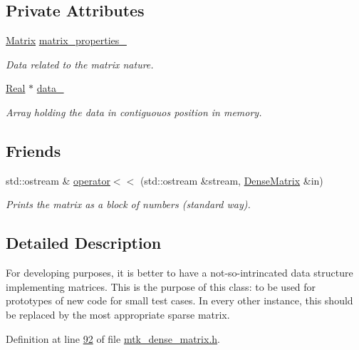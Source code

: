 \subsection*{Private Attributes}
\begin{DoxyCompactItemize}
\item 
\hyperlink{classmtk_1_1Matrix}{Matrix} \hyperlink{classmtk_1_1DenseMatrix_a481c8d09af685a5ba67acefdcaa810cc}{matrix\-\_\-properties\-\_\-}
\begin{DoxyCompactList}\small\item\em Data related to the matrix nature. \end{DoxyCompactList}\item 
\hyperlink{group__c01-roots_gac080bbbf5cbb5502c9f00405f894857d}{Real} $\ast$ \hyperlink{classmtk_1_1DenseMatrix_a7893e4e5c8d2e2de32b156177e78cb6f}{data\-\_\-}
\begin{DoxyCompactList}\small\item\em Array holding the data in contiguouos position in memory. \end{DoxyCompactList}\end{DoxyCompactItemize}
\subsection*{Friends}
\begin{DoxyCompactItemize}
\item 
std\-::ostream \& \hyperlink{classmtk_1_1DenseMatrix_adbcc850ef373550f634f563573a31d28}{operator$<$$<$} (std\-::ostream \&stream, \hyperlink{classmtk_1_1DenseMatrix}{Dense\-Matrix} \&in)
\begin{DoxyCompactList}\small\item\em Prints the matrix as a block of numbers (standard way). \end{DoxyCompactList}\end{DoxyCompactItemize}


\subsection{Detailed Description}
For developing purposes, it is better to have a not-\/so-\/intrincated data structure implementing matrices. This is the purpose of this class\-: to be used for prototypes of new code for small test cases. In every other instance, this should be replaced by the most appropriate sparse matrix. 

Definition at line \hyperlink{mtk__dense__matrix_8h_source_l00092}{92} of file \hyperlink{mtk__dense__matrix_8h_source}{mtk\-\_\-dense\-\_\-matrix.\-h}.




